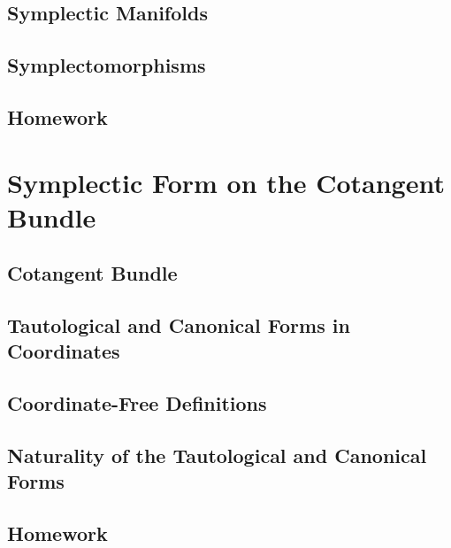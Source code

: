 \documentclass{paper}
\begin{document}
\subsection{Symplectic Manifolds}
\subsection{Symplectomorphisms}
\subsection{Homework}
\section{Symplectic Form on the Cotangent Bundle}
\subsection{Cotangent Bundle}
\subsection{Tautological and Canonical Forms in Coordinates}
\subsection{Coordinate-Free Definitions}
\subsection{Naturality of the Tautological and Canonical Forms}
\subsection{Homework} 
\end{document}

